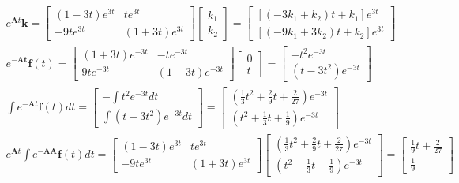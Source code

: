 \documentclass[10pt]{article}
\begin{document}
$$
\begin{gathered}
e^{\mathbf{A} t} \mathbf{k}=\left[\begin{array}{cc}
(1-3 t) e^{3 t} & t e^{3 t} \\
-9 t e^{3 t} & (1+3 t) e^{3 t}
\end{array}\right]\left[\begin{array}{l}
k_{1} \\
k_{2}
\end{array}\right]=\left[\begin{array}{l}
{\left[\left(-3 k_{1}+k_{2}\right) t+k_{1}\right] e^{3 t}} \\
{\left[\left(-9 k_{1}+3 k_{2}\right) t+k_{2}\right] e^{3 t}}
\end{array}\right] \\
e^{-\mathbf{A} \mathbf{t}} \mathbf{f}(t)=\left[\begin{array}{cc}
(1+3 t) e^{-3 t} & -t e^{-3 t} \\
9 t e^{-3 t} & (1-3 t) e^{-3 t}
\end{array}\right]\left[\begin{array}{l}
0 \\
t
\end{array}\right]=\left[\begin{array}{c}
-t^{2} e^{-3 t} \\
\left(t-3 t^{2}\right) e^{-3 t}
\end{array}\right] \\
\int e^{-\mathbf{A} t} \mathbf{f}(t) d t=\left[\begin{array}{c}
-\int t^{2} e^{-3 t} d t \\
\int\left(t-3 t^{2}\right) e^{-3 t} d t
\end{array}\right]=\left[\begin{array}{l}
\left(\frac{1}{3} t^{2}+\frac{2}{9} t+\frac{2}{27}\right) e^{-3 t} \\
\left(t^{2}+\frac{1}{3} t+\frac{1}{9}\right) e^{-3 t}
\end{array}\right] \\
e^{\mathbf{A} t} \int e^{-\mathbf{A} \mathbf{A}} \mathbf{f}(t) d t=\left[\begin{array}{cc}
(1-3 t) e^{3 t} & t e^{3 t} \\
-9 t e^{3 t} & (1+3 t) e^{3 t}
\end{array}\right]\left[\begin{array}{l}
\left(\frac{1}{3} t^{2}+\frac{2}{9} t+\frac{2}{27}\right) e^{-3 t} \\
\left(t^{2}+\frac{1}{3} t+\frac{1}{9}\right) e^{-3 t}
\end{array}\right]=\left[\begin{array}{c}
\frac{1}{9} t+\frac{2}{27} \\
\frac{1}{9}
\end{array}\right]
\end{gathered}
$$
\end{document}
